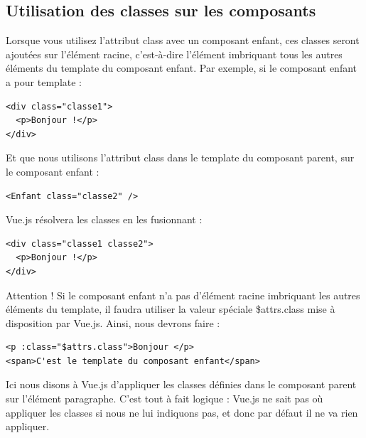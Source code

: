 \subsection{Utilisation des classes sur les composants}
Lorsque vous utilisez l'attribut {\color{monOrange}class} avec un composant enfant, ces classes seront ajoutées sur l'élément racine, c'est-à-dire l'élément imbriquant tous les autres éléments du {\color{monOrange}template} du composant enfant. Par exemple, si le composant enfant a pour {\color{monOrange}template} :
\begin{verbatim}
<div class="classe1">
  <p>Bonjour !</p>
</div>
\end{verbatim}
Et que nous utilisons l'attribut {\color{monOrange}class} dans le {\color{monOrange}template} du composant parent, sur le composant enfant :
\begin{verbatim}
<Enfant class="classe2" />
\end{verbatim}
{\color{monOrange}Vue.js} résolvera les classes en les fusionnant :
\begin{verbatim}
<div class="classe1 classe2">
  <p>Bonjour !</p>
</div>
\end{verbatim}
Attention ! Si le composant enfant n'a pas d'élément racine imbriquant les autres éléments du {\color{monOrange}template}, il faudra utiliser la valeur spéciale {\color{monOrange}\$attrs.class} mise à disposition par {\color{monOrange}Vue.js}. Ainsi, nous devrons faire :
\begin{verbatim}
<p :class="$attrs.class">Bonjour </p>
<span>C'est le template du composant enfant</span>
\end{verbatim}
Ici nous disons à {\color{monOrange}Vue.js} d'appliquer les classes définies dans le composant parent sur l'élément paragraphe. C'est tout à fait logique : {\color{monOrange}Vue.js} ne sait pas où appliquer les classes si nous ne lui indiquons pas, et donc par défaut il ne va rien appliquer.

